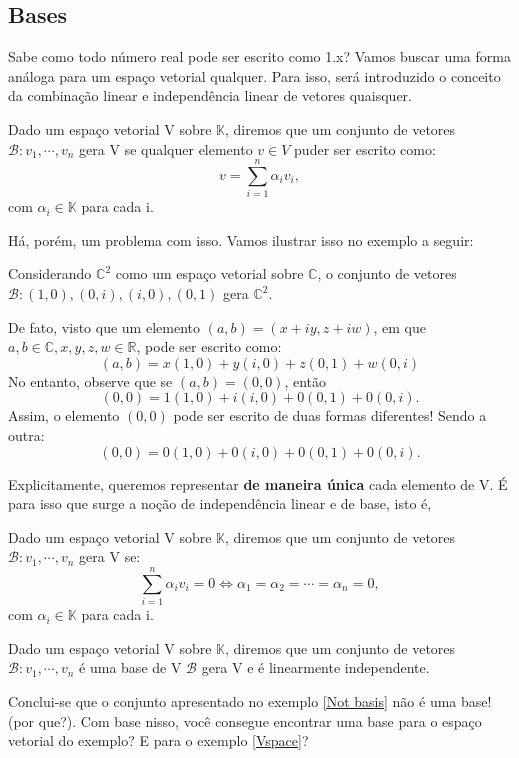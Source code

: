 \subsection{Bases}
Sabe como todo n\'umero real pode ser escrito como 1.x? Vamos buscar uma forma an\'aloga para um espa\c co vetorial
qualquer. Para isso, ser\'a introduzido o conceito da combina\c c\~ao linear e independ\^encia linear de vetores quaisquer.

\begin{def*}
    Dado um  espa\c co vetorial V sobre $\mathbb{K}$, diremos que um conjunto de vetores $\mathcal{B}: v_1, \cdots{}, v_n$ gera V
    se qualquer elemento $v\in{V}$ puder ser escrito como: 
    $$
        v = \sum_{i=1}^{n}\alpha_iv_i,
    $$
    com $\alpha_i\in\mathbb{K}$ para cada i.
\end{def*}
H\'a, por\'em, um problema com isso. Vamos ilustrar isso no exemplo a seguir: 
\begin{example}[NB]
\label{Not basis}
    Considerando $\mathbb{C}^2$ como um espa\c co vetorial sobre $\mathbb{C}$, o conjunto de vetores 
    $\mathcal{B}: (1, 0), (0, i), (i, 0), (0, 1)$ gera $\mathbb{C}^2$.
    
    De fato, visto que um elemento $(a, b) = (x + iy, z + iw)$, em que $a, b\in\mathbb{C}, x, y, z, w\in\mathbb{R}$, pode ser escrito como:
    $$
        (a, b) = x(1, 0) + y(i, 0) + z(0, 1) + w(0, i) 
    $$
    No entanto, observe que se $(a, b) = (0, 0)$, ent\~ao 
    $$
        (0, 0) = 1(1, 0) + i(i, 0) + 0(0, 1) + 0(0, i).
    $$
    Assim, o elemento $(0, 0)$ pode ser escrito de duas formas diferentes! Sendo a outra:
    $$
        (0, 0) = 0(1, 0) + 0(i, 0) + 0(0, 1) + 0(0, i).
    $$
\end{example}
Explicitamente, queremos representar \textbf{de maneira \'unica} cada elemento de V. \'E para isso que surge
a no\c c\~ao de independ\^encia linear e de base, isto \'e, 
\begin{def*}
    Dado um  espa\c co vetorial V sobre $\mathbb{K}$, diremos que um conjunto de vetores $\mathcal{B}: v_1, \cdots{}, v_n$ gera V
    se: 
    $$
        \sum_{i=1}^{n}\alpha_iv_i = 0 \Leftrightarrow \alpha_1 = \alpha_2 = \cdots = \alpha_n = 0,
    $$
    com $\alpha_i\in\mathbb{K}$ para cada i.    
\end{def*} 

\begin{def*}
    Dado um  espa\c co vetorial V sobre $\mathbb{K}$, diremos que um conjunto de vetores $\mathcal{B}: v_1, \cdots{}, v_n$ \'e uma base de V
    $\mathcal{B}$ gera V e \'e linearmente independente.
\end{def*}

Conclui-se que o conjunto apresentado no exemplo \ref{Not basis} n\~ao \'e uma base! (por que?). Com base nisso, 
voc\^e consegue encontrar uma base para o espa\c co vetorial do exemplo? E para o exemplo \ref{Vspace}?